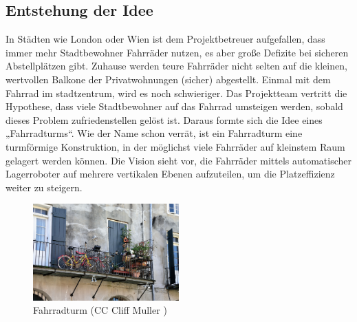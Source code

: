 \subsection{Entstehung der Idee}

In Städten wie London oder Wien ist dem Projektbetreuer aufgefallen, dass immer mehr Stadtbewohner Fahrräder nutzen, es aber große Defizite bei sicheren Abstellplätzen gibt. Zuhause werden teure Fahrräder nicht selten auf die kleinen, wertvollen Balkone der Privatwohnungen (sicher) abgestellt. Einmal mit dem Fahrrad im stadtzentrum, wird es noch schwieriger. Das Projektteam vertritt die Hypothese, dass viele Stadtbewohner auf das Fahrrad umsteigen werden, sobald dieses Problem zufriedenstellen gelöst ist. Daraus formte sich die Idee eines „Fahrradturms“. Wie der Name schon verrät, ist ein Fahrradturm eine turmförmige Konstruktion, in der möglichst viele Fahrräder auf kleinstem Raum gelagert werden können. Die Vision sieht vor, die Fahrräder mittels automatischer Lagerroboter auf mehrere vertikalen Ebenen aufzuteilen, um die Platzeffizienz weiter zu steigern.

\begin{figure}[ht]
  \begin{center}
    \includegraphics[width=0.5\textwidth]{images/fahrrad_balkon.jpg}
    \caption{Fahrradturm (CC Cliff Muller \cite{cc})}
    \label{fig:fahrrad_balkon}
  \end{center}
\end{figure}